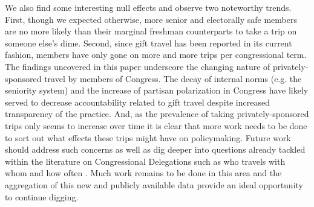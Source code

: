 \documentclass[12pt]{article}                           %
\begin{document}
We also find some interesting null effects and observe two noteworthy trends. First, though we expected otherwise, more senior and electorally safe members are no more likely than their marginal freshman counterparts to take a trip on someone else's dime. Second, since gift travel has been reported in its current fashion, members have only gone on more and more trips per congressional term. The findings uncovered in this paper underscore the changing nature of privately-sponsored travel by members of Congress. The decay of internal norms (e.g. the seniority system) and the increase of partisan polarization in Congress have likely served to decrease accountability related to gift travel despite increased transparency of the practice. And, as the prevalence of taking privately-sponsored trips only seems to increase over time it is clear that more work needs to be done to sort out what effects these trips might have on policymaking. Future work should address such concerns as well as dig deeper into questions already tackled within the literature on Congressional Delegations such as who travels with whom and how often \citep{Alduncin2014,Alduncin2017}. Much work remains to be done in this area and the aggregation of this new and publicly available data provide an ideal opportunity to continue digging.

\newpage
\theendnotes
\end{document}
